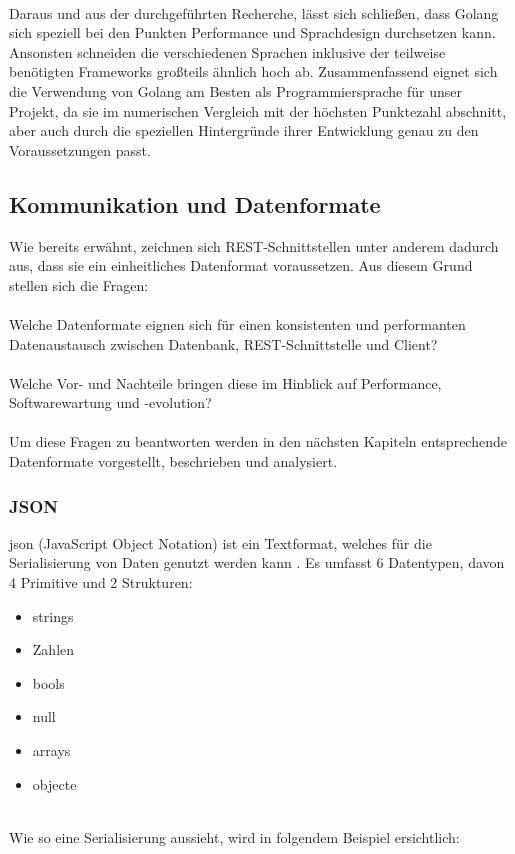 		\label{tbl:comparisonlang}~\\
		Daraus und aus der durchgeführten Recherche, lässt sich schließen, dass Golang sich speziell bei den Punkten Performance und Sprachdesign durchsetzen kann. Ansonsten schneiden die verschiedenen Sprachen inklusive der teilweise benötigten Frameworks großteils ähnlich hoch ab. Zusammenfassend eignet sich die Verwendung von Golang am Besten als Programmiersprache für unser Projekt, da sie im numerischen Vergleich mit der höchsten Punktezahl abschnitt, aber auch durch die speziellen Hintergründe ihrer Entwicklung genau zu den Voraussetzungen passt.
	\subsection{Kommunikation und Datenformate}
	Wie bereits erwähnt, zeichnen sich REST-Schnittstellen unter anderem dadurch aus, dass sie ein einheitliches Datenformat voraussetzen. Aus diesem Grund stellen sich die Fragen: \\~\\
	Welche Datenformate eignen sich für einen konsistenten und performanten Datenaustausch zwischen Datenbank, REST-Schnittstelle und Client? \\~\\
	Welche Vor- und Nachteile bringen diese im Hinblick auf Performance, Softwarewartung und -evolution?\\~\\
	Um diese Fragen zu beantworten werden in den nächsten Kapiteln entsprechende Datenformate vorgestellt, beschrieben und analysiert.
	
	\newpage
		\label{sec:json}
		\subsubsection{JSON}
		\Gls{json} (JavaScript Object Notation) ist ein Textformat, welches für die Serialisierung von Daten genutzt werden kann \cite{rfc4627}. 
		Es umfasst 6 Datentypen, davon 4 Primitive und 2 Strukturen:
		\begin{itemize}
			\item \Gls{string}s
			\item Zahlen
			\item \Gls{bool}s
			\item \Gls{null}
			\item \Gls{array}s
			\item \Gls{object}e
		\end{itemize}
		\label{code:jsontypes}~\\	
		Wie so eine Serialisierung aussieht, wird in folgendem Beispiel ersichtlich: 
		
